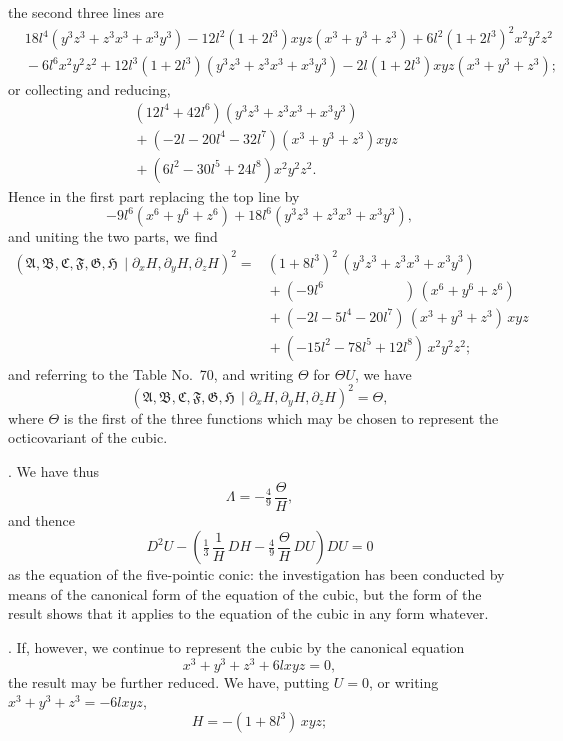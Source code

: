 \documentclass[11pt]{article}
\newcommand{\Cdel}{\mid}
\begin{document}
\noindent the second three lines are
\[
\begin{aligned}
&18l^4(y^3z^3 + z^3x^3 + x^3y^3) - 12l^2(1 + 2l^3)xyz(x^3 + y^3 + z^3) + 6l^2(1 + 2l^3)^2 x^2y^2z^2\\
&{}- 6l^6 x^2y^2z^2 + 12l^3(1 + 2l^3)(y^3z^3 + z^3x^3 + x^3y^3) - 2l(1 + 2l^3)xyz(x^3 + y^3 + z^3);
\end{aligned}
\]
or collecting and reducing,
\[
\begin{aligned}
&(12l^4 + 42l^6)(y^3z^3 + z^3x^3 + x^3y^3)\\
&{}+ (-2l - 20l^4 - 32l^7)(x^3 + y^3 + z^3)xyz\\
&{}+ (6l^2 - 30l^5 + 24l^8)x^2y^2z^2.
\end{aligned}
\]
Hence in the first part replacing the top line by
\[
-9l^6(x^6 + y^6 + z^6) + 18l^6(y^3z^3 + z^3x^3 + x^3y^3),
\]
and uniting the two parts, we find
\[
\begin{aligned}
(\mathfrak{A}, \mathfrak{B}, \mathfrak{C}, \mathfrak{F}, \mathfrak{G}, \mathfrak{H}\,\Cdel\partial_x H, \partial_y H, \partial_z H)^2
={}& (1 + 8l^3)^2\,(y^3z^3 + z^3x^3 + x^3y^3)\\
&{}+ (-9l^6\phantom{xxxxxxxxxx})\,(x^6 + y^6 + z^6)\\
&{}+ (-2l - 5l^4 - 20l^7)\,(x^3 + y^3 + z^3)\,xyz\\
&{}+ (-15l^2 - 78l^5 + 12l^8)\,x^2y^2z^2;
\end{aligned}
\]
and referring to the Table No.~70, and writing $\Theta$ for $\Theta U$, we have
\[
(\mathfrak{A}, \mathfrak{B}, \mathfrak{C}, \mathfrak{F}, \mathfrak{G}, \mathfrak{H}\,\Cdel\partial_x H, \partial_y H, \partial_z H)^2 = \Theta,
\]
where $\Theta$ is the first of the three functions which may be chosen to represent the octicovariant of the cubic.

\medskip

. We have thus
\[
\Lambda = -\tfrac{4}{9}\,\frac{\Theta}{H},
\]
and thence
\[
D^2 U - \!\left(\tfrac{1}{3}\,\frac{1}{H}\,DH - \tfrac{4}{9}\,\frac{\Theta}{H}\,DU\right)\!DU = 0
\]
as the equation of the five-pointic conic: the investigation has been conducted by means of the canonical form of the equation of the cubic, but the form of the result shows that it applies to the equation of the cubic in any form whatever.

\medskip

. If, however, we continue to represent the cubic by the canonical equation
\[
x^3 + y^3 + z^3 + 6lxyz = 0,
\]
the result may be further reduced. We have, putting $U = 0$, or writing $x^3 + y^3 + z^3 = -6lxyz$,
\[
H = -(1 + 8l^3)\,xyz;
\]
\end{document}
